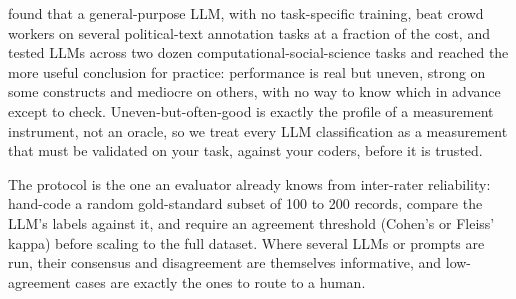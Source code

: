 \textcite{gilardi2023annotation} found that a general-purpose LLM, with no task-specific training, beat crowd workers on several political-text annotation tasks at a fraction of the cost, and \textcite{ziems2024css} tested LLMs across two dozen computational-social-science tasks and reached the more useful conclusion for practice: performance is real but uneven, strong on some constructs and mediocre on others, with no way to know which in advance except to check. Uneven-but-often-good is exactly the profile of a measurement instrument, not an oracle, so we treat every LLM classification as a measurement that must be validated on your task, against your coders, before it is trusted.

The protocol is the one an evaluator already knows from inter-rater reliability: hand-code a random gold-standard subset of 100 to 200 records, compare the LLM's labels against it, and require an agreement threshold (Cohen's or Fleiss' kappa) before scaling to the full dataset. Where several LLMs or prompts are run, their consensus and disagreement are themselves informative, and low-agreement cases are exactly the ones to route to a human.

